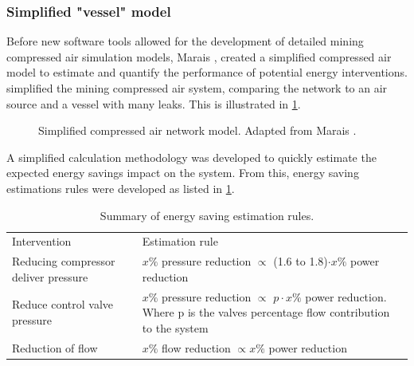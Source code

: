 \subsubsection{Simplified "vessel"  model}
Before new software tools allowed for the development of detailed mining compressed air simulation models, Marais \cite{Marais2012PhD},\cite{marais2013simplification} created a simplified compressed air model to estimate and quantify the performance of potential energy interventions.  \cite{Marais2012PhD} simplified the mining compressed air system, comparing the network to an air source and a vessel with many leaks. This is illustrated in \cref{fig:Marais vessel model}.
\begin{figure}[h!]
	\centering
	\caption[Simplified compressed air netowrk model.]{Simplified compressed air network model. Adapted from Marais \cite{Marais2012PhD}.}
	\label{fig:Marais vessel model}
\end{figure}
\par 
A simplified calculation methodology was developed to quickly estimate the expected energy savings impact on the system. From this, energy saving estimations rules were developed as listed in \cref{table: Rules of thumb}.  
\par 
\begin{table}[h]
	\centering
	\begin{tabular}{p{}p{}p{}}
		\hline
		Intervention && Estimation rule\\
		\hhline{===} 
		Reducing compressor deliver pressure & & $x \%$ pressure reduction  $\propto$ (1.6 to 1.8)$\cdot x\%$ power reduction \newline \\
		Reduce control valve pressure &  &$x \%$ pressure reduction $\propto$  $p\cdot x\%$ power reduction. \newline \newline Where p is the valves percentage flow contribution to the system \newline \\
		Reduction of flow && $x \%$ flow reduction  $\propto x \%$ power reduction \newline\\
		\hline
	\end{tabular} 
	\caption[Summary of energy saving estimation rules]{Summary of energy saving estimation rules\cite{Marais2012PhD}.}
	\label{table: Rules of thumb}
\end{table}
